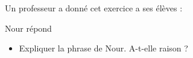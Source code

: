 \documentclass[exercice]{thedocument}%
\begin{document}
%
Un professeur a donné cet exercice a ses élèves :
\begin{mdframed}
\end{mdframed}
Nour répond 
\begin{itemize}
    \item Expliquer la phrase de Nour. A-t-elle raison ?
\end{itemize}
\end{document}
